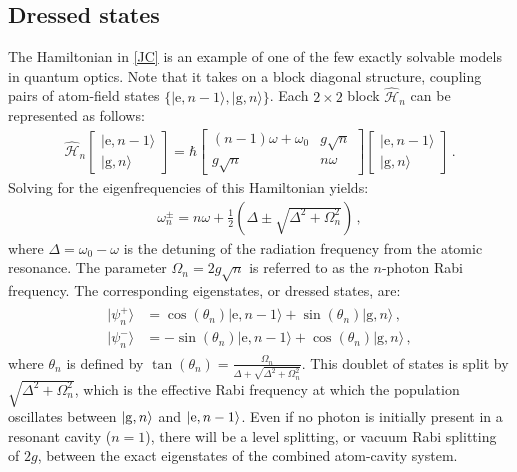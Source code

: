 \documentclass[../Thesis-IJspeert.tex]{subfiles}
\begin{document}
\subsection{Dressed states}
The Hamiltonian in \autoref{JC} is an example of one of the few exactly solvable models in quantum optics. Note that it takes on a block diagonal structure, coupling pairs of atom-field states $\{\vert\mathrm{e},n-1\rangle, \vert\mathrm{g}, n\rangle\}$. Each $2\times2$ block $\hat{\mathcal{H}}_n$ can be represented as follows:
\vspace{1em}
\begin{align}
\hat{\mathcal{H}}_n \begin{bmatrix}  \vert \mathrm{e}, n-1\rangle \\ \vert \mathrm{g}, n\rangle \end{bmatrix} = \hbar \begin{bmatrix} (n-1)\omega + \omega_0 & g\sqrt{n} \\ g\sqrt{n} & n\omega \end{bmatrix} \begin{bmatrix}  \vert \mathrm{e}, n-1\rangle \\ \vert \mathrm{g}, n\rangle \end{bmatrix}\,.
\end{align}
Solving for the eigenfrequencies of this Hamiltonian yields:
\begin{align}
\omega^\pm_n = n\omega + \frac{1}{2}\left( \Delta \pm \sqrt{\Delta^2 + \Omega_n^2}\right)\,,
\end{align}
where $\Delta = \omega_0 - \omega$ is the detuning of the radiation frequency from the atomic resonance. The parameter \(\Omega_n = 2g\sqrt{n}\) is referred to as the $n$-photon Rabi frequency. The corresponding eigenstates, or dressed states, are:
\begin{align}
\label{dressedstates}
\begin{split}
\vert  \psi^+_n\rangle &= \cos\left({\theta_n}\right) \vert \mathrm{e}, n-1\rangle + \sin\left({\theta_n}\right) \vert \mathrm{g}, n\rangle \,,\\
\vert \psi^-_n\rangle &= - \sin\left({\theta_n}\right) \vert \mathrm{e}, n-1\rangle + \cos\left({\theta_n}\right) \vert \mathrm{g}, n\rangle \,,
\end{split}
\end{align}
where $\theta_n$ is defined by $\tan(\theta_n)=\frac{\Omega_n}{\Delta+\sqrt{\Delta^2+\Omega_n^2}}$. This doublet of states is split by $\sqrt{\Delta^2 + \Omega_n^2}$, which is the effective Rabi frequency at which the population oscillates between $\ket{\mathrm{g},n}$ and $\ket{\mathrm{e},n-1}$. Even if no photon is initially present in a resonant cavity ($n=1$), there will be a level splitting, or vacuum Rabi splitting of $2g$, between the exact eigenstates of the combined atom-cavity system.
\end{document}
